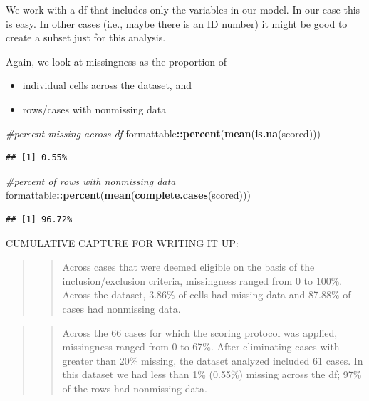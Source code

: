 \documentclass[
  11pt,
]{book}
\newenvironment{Shaded}{\begin{snugshade}}{\end{snugshade}}
\newcommand{\CommentTok}[1]{\textcolor[rgb]{0.37,0.37,0.37}{\textit{#1}}}
\newcommand{\FunctionTok}[1]{\textcolor[rgb]{0.27,0.27,0.27}{\textbf{#1}}}
\newcommand{\NormalTok}[1]{#1}
\newcommand{\SpecialCharTok}[1]{\textcolor[rgb]{0.43,0.43,0.43}{\textbf{#1}}}
\providecommand{\tightlist}{%
  \setlength{\itemsep}{0pt}\setlength{\parskip}{0pt}}
\begin{document}
We work with a df that includes only the variables in our model. In our case this is easy. In other cases (i.e., maybe there is an ID number) it might be good to create a subset just for this analysis.

Again, we look at missingness as the proportion of

\begin{itemize}
\tightlist
\item
  individual cells across the dataset, and
\item
  rows/cases with nonmissing data
\end{itemize}

\begin{Shaded}
\begin{Highlighting}[]
\CommentTok{\#percent missing across df}
\NormalTok{formattable}\SpecialCharTok{::}\FunctionTok{percent}\NormalTok{(}\FunctionTok{mean}\NormalTok{(}\FunctionTok{is.na}\NormalTok{(scored)))}
\end{Highlighting}
\end{Shaded}

\begin{verbatim}
## [1] 0.55%
\end{verbatim}

\begin{Shaded}
\begin{Highlighting}[]
\CommentTok{\#percent of rows with nonmissing data}
\NormalTok{formattable}\SpecialCharTok{::}\FunctionTok{percent}\NormalTok{(}\FunctionTok{mean}\NormalTok{(}\FunctionTok{complete.cases}\NormalTok{(scored))) }
\end{Highlighting}
\end{Shaded}

\begin{verbatim}
## [1] 96.72%
\end{verbatim}

CUMULATIVE CAPTURE FOR WRITING IT UP:

\begin{quote}
\begin{quote}
Across cases that were deemed eligible on the basis of the inclusion/exclusion criteria, missingness ranged from 0 to 100\%. Across the dataset, 3.86\% of cells had missing data and 87.88\% of cases had nonmissing data.
\end{quote}
\end{quote}

\begin{quote}
\begin{quote}
Across the 66 cases for which the scoring protocol was applied, missingness ranged from 0 to 67\%. After eliminating cases with greater than 20\% missing, the dataset analyzed included 61 cases. In this dataset we had less than 1\% (0.55\%) missing across the df; 97\% of the rows had nonmissing data.
\end{quote}
\end{quote}
\end{document}
